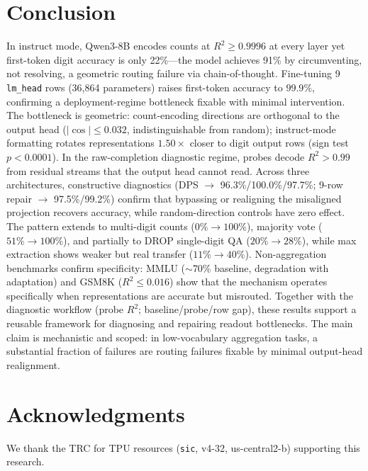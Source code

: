 \documentclass{article}
\begin{document}
\section*{Conclusion}

In instruct mode, Qwen3-8B encodes counts at $R^2 \geq 0.9996$ at every layer yet first-token digit accuracy is only 22\%---the model achieves 91\% by circumventing, not resolving, a geometric routing failure via chain-of-thought.
Fine-tuning 9 \texttt{lm\_head} rows (36,864 parameters) raises first-token accuracy to $99.9\%$, confirming a deployment-regime bottleneck fixable with minimal intervention.
The bottleneck is geometric: count-encoding directions are orthogonal to the output head ($|\cos| \leq 0.032$, indistinguishable from random); instruct-mode formatting rotates representations $1.50\times$ closer to digit output rows (sign test $p < 0.0001$).
In the raw-completion diagnostic regime, probes decode $R^2 > 0.99$ from residual streams that the output head cannot read.
Across three architectures, constructive diagnostics (DPS $\to$ 96.3\%/100.0\%/97.7\%; 9-row repair $\to$ 97.5\%/99.2\%) confirm that bypassing or realigning the misaligned projection recovers accuracy, while random-direction controls have zero effect.
The pattern extends to multi-digit counts ($0\% \to 100\%$), majority vote ($51\% \to 100\%$), and partially to DROP single-digit QA ($20\% \to 28\%$), while max extraction shows weaker but real transfer ($11\% \to 40\%$).
Non-aggregation benchmarks confirm specificity: MMLU ($\sim$70\% baseline, degradation with adaptation) and GSM8K ($R^2 \leq 0.016$) show that the mechanism operates specifically when representations are accurate but misrouted.
Together with the diagnostic workflow (probe $R^2$; baseline/probe/row gap), these results support a reusable framework for diagnosing and repairing readout bottlenecks.
The main claim is mechanistic and scoped: in low-vocabulary aggregation tasks, a substantial fraction of failures are routing failures fixable by minimal output-head realignment.

\section*{Acknowledgments}
We thank the TRC for TPU resources (\texttt{sic}, v4-32, us-central2-b) supporting this research.



\end{document}
